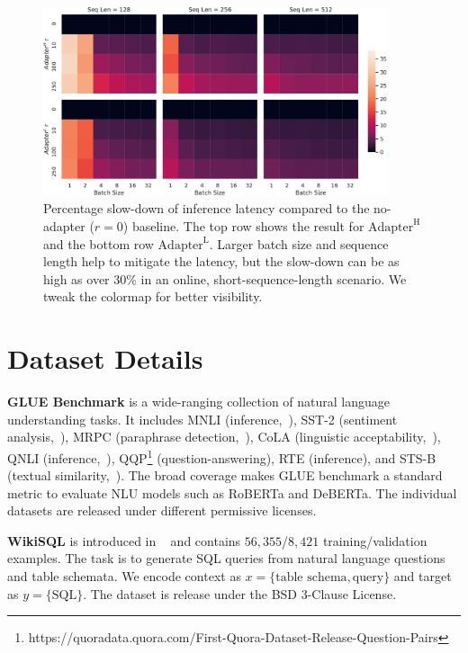 \documentclass{article} %
\begin{document}
\begin{figure}[h]
  \centering
    \includegraphics[width=0.9\textwidth]{figures/latency.pdf}
    \caption{Percentage slow-down of inference latency compared to the no-adapter ($r=0$) baseline. The top row shows the result for $\text{Adapter}^{\text{H}}$ and the bottom row $\text{Adapter}^{\text{L}}$. Larger batch size and sequence length help to mitigate the latency, but the slow-down can be as high as over 30\% in an online, short-sequence-length scenario. We tweak the colormap for better visibility.}
    \label{fig:adapter_latency}
\end{figure}

\section{Dataset Details}
\label{app:datasets}




\textbf{GLUE Benchmark}
is a wide-ranging collection of natural language understanding tasks.
It includes MNLI (inference,~\citet{williams-etal-2018-broad}), SST-2 (sentiment analysis,~\citet{socher-etal-2013-recursive}), MRPC (paraphrase detection,~\citet{dolan-brockett-2005-automatically}), CoLA (linguistic acceptability,~\citet{warstadt2018neural}), QNLI (inference,~\citet{DBLP:journals/corr/abs-1806-03822}), QQP\footnote{https://quoradata.quora.com/First-Quora-Dataset-Release-Question-Pairs} (question-answering), RTE (inference), and STS-B (textual similarity,~\citet{Cer_2017}).
The broad coverage makes GLUE benchmark a standard metric to evaluate NLU models such as RoBERTa and DeBERTa.
The individual datasets are released under different permissive licenses.


\textbf{WikiSQL}
is introduced in ~\cite{DBLP:journals/corr/abs-1709-00103} and contains $56,355$/$8,421$ training/validation examples.
The task is to generate SQL queries from natural language questions and table schemata.
We encode context as $x = \{ \text{table schema}, \text{query} \}$ and target as $y = \{ \text{SQL} \}$.
The dataset is release under the BSD 3-Clause License.
\end{document}
